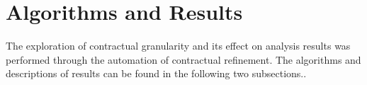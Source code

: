 \section{Algorithms and Results}
The exploration of contractual granularity and its effect on analysis results was performed through the automation of contractual refinement. The algorithms and descriptions of results can be found in the following two subsections.. %



%
%

